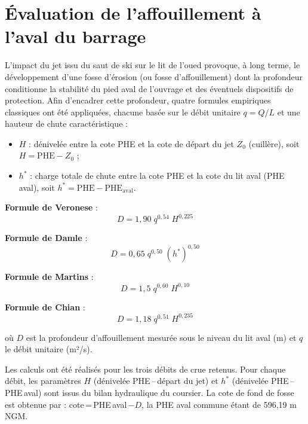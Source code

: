 \section{Évaluation de l'affouillement à l'aval du barrage}
\label{sec:affouillement}

L'impact du jet issu du saut de ski sur le lit de l'oued provoque, à long terme, le développement d'une fosse d'érosion (ou fosse d'affouillement) dont la profondeur conditionne la stabilité du pied aval de l'ouvrage et des éventuels dispositifs de protection. Afin d'encadrer cette profondeur, quatre formules empiriques classiques ont été appliquées, chacune basée sur le débit unitaire $q = Q/L$ et une hauteur de chute caractéristique :

\begin{itemize}
    \item $H$ : dénivelée entre la cote PHE et la cote de départ du jet $Z_0$ (cuillère), soit $H = \mathrm{PHE} - Z_0$ ;
    \item $h^*$ : charge totale de chute entre la cote PHE et la cote du lit aval (PHE aval), soit $h^* = \mathrm{PHE} - \mathrm{PHE_{aval}}$.
\end{itemize}

\noindent\textbf{Formule de Veronese} \cite{usbr1987design} :
\begin{equation}
D = 1{,}90 \; q^{0,54} \; H^{0,225}
\label{eq:affouillement_veronese}
\end{equation}

\noindent\textbf{Formule de Damle} :
\begin{equation}
D = 0{,}65 \; q^{0,50} \; (h^*)^{0,50}
\label{eq:affouillement_damle}
\end{equation}

\noindent\textbf{Formule de Martins} :
\begin{equation}
D = 1{,}5 \; q^{0,60} \; H^{0,10}
\label{eq:affouillement_martins}
\end{equation}

\noindent\textbf{Formule de Chian} :
\begin{equation}
D = 1{,}18 \; q^{0,51} \; H^{0,235}
\label{eq:affouillement_chian}
\end{equation}

\noindent où $D$ est la profondeur d'affouillement mesurée sous le niveau du lit aval (m) et $q$ le débit unitaire (m²/s).

\medskip
Les calculs ont été réalisés pour les trois débits de crue retenus. Pour chaque débit, les paramètres $H$ (dénivelée PHE\,--\,départ du jet) et $h^*$ (dénivelée PHE\,--\,PHE\,aval) sont issus du bilan hydraulique du coursier. La cote de fond de fosse est obtenue par : cote\,=\,PHE\,aval\,$- D$, la PHE aval commune étant de 596,19 m NGM.

